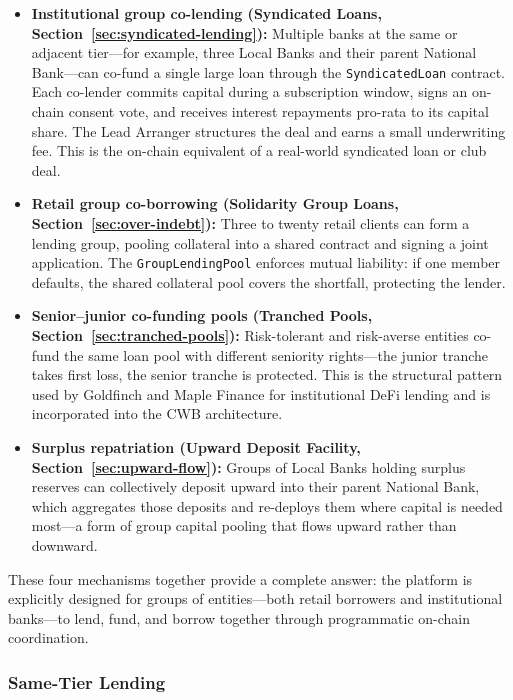 \documentclass[12pt,a4paper]{report}
\begin{document}
\begin{itemize}[noitemsep]
\item \textbf{Institutional group co-lending (Syndicated Loans, Section~\ref{sec:syndicated-lending}):} Multiple banks at the same or adjacent tier---for example, three Local Banks and their parent National Bank---can co-fund a single large loan through the \texttt{SyndicatedLoan} contract. Each co-lender commits capital during a subscription window, signs an on-chain consent vote, and receives interest repayments pro-rata to its capital share. The Lead Arranger structures the deal and earns a small underwriting fee. This is the on-chain equivalent of a real-world syndicated loan or club deal.
\item \textbf{Retail group co-borrowing (Solidarity Group Loans, Section~\ref{sec:over-indebt}):} Three to twenty retail clients can form a lending group, pooling collateral into a shared contract and signing a joint application. The \texttt{GroupLendingPool} enforces mutual liability: if one member defaults, the shared collateral pool covers the shortfall, protecting the lender.
\item \textbf{Senior--junior co-funding pools (Tranched Pools, Section~\ref{sec:tranched-pools}):} Risk-tolerant and risk-averse entities co-fund the same loan pool with different seniority rights---the junior tranche takes first loss, the senior tranche is protected. This is the structural pattern used by Goldfinch and Maple Finance for institutional DeFi lending and is incorporated into the CWB architecture.
\item \textbf{Surplus repatriation (Upward Deposit Facility, Section~\ref{sec:upward-flow}):} Groups of Local Banks holding surplus reserves can collectively deposit upward into their parent National Bank, which aggregates those deposits and re-deploys them where capital is needed most---a form of group capital pooling that flows upward rather than downward.
\end{itemize}

These four mechanisms together provide a complete answer: the platform is explicitly designed for groups of entities---both retail borrowers and institutional banks---to lend, fund, and borrow together through programmatic on-chain coordination.

\subsubsection{Same-Tier Lending}
\end{document}
